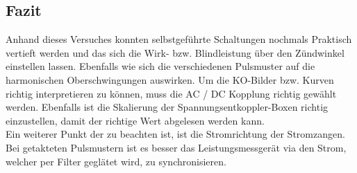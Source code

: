 \subsection{Fazit}
Anhand dieses Versuches konnten selbstgeführte Schaltungen nochmals Praktisch vertieft werden und das sich die Wirk- bzw. Blindleistung über den Zündwinkel einstellen lassen. Ebenfalls wie sich die verschiedenen Pulsmuster auf die harmonischen Oberschwingungen auswirken. 
Um die KO-Bilder bzw. Kurven richtig interpretieren zu können, muss die AC / DC Kopplung richtig gewählt werden. Ebenfalls ist die Skalierung der Spannungsentkoppler-Boxen richtig einzustellen, damit der richtige Wert abgelesen werden kann.\\
Ein weiterer Punkt der zu beachten ist, ist die Stromrichtung der Stromzangen. Bei getakteten Pulsmustern ist es besser das Leistungsmessgerät via den Strom, welcher per Filter geglätet wird, zu synchronisieren.

\clearpage